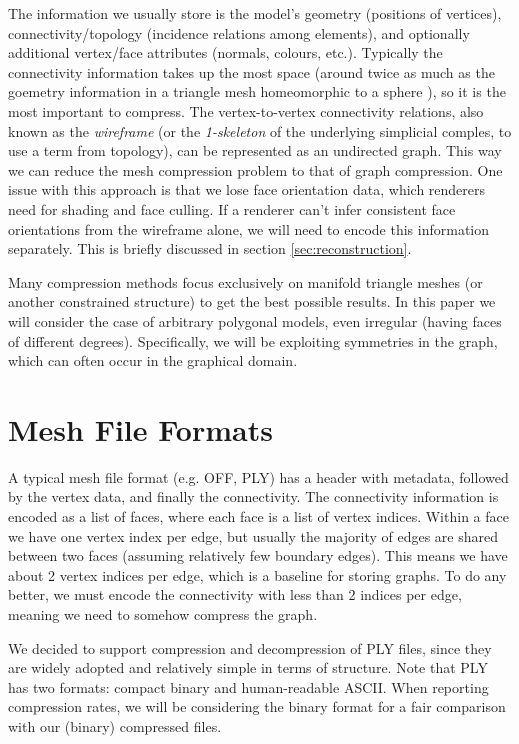 \documentclass{egpubl}
\begin{document}
The information we usually store is the model's geometry (positions of vertices), connectivity/topology (incidence relations among elements), and optionally additional vertex/face attributes (normals, colours, etc.).
Typically the connectivity information takes up the most space (around twice as much as the goemetry information in a triangle mesh homeomorphic to a sphere \cite{rossignac1999edgebreaker}), so it is the most important to compress.
The vertex-to-vertex connectivity relations, also known as the \textit{wireframe} (or the \textit{1-skeleton} of the underlying simplicial comples, to use a term from topology),
can be represented as an undirected graph.
This way we can reduce the mesh compression problem to that of graph compression.
One issue with this approach is that we lose face orientation data, which renderers need for shading and face culling. If a renderer can't infer consistent face orientations from the wireframe alone, we will need to encode this information separately. This is briefly discussed in section \ref{sec:reconstruction}.

Many compression methods focus exclusively on manifold triangle meshes (or another constrained structure) to get the best possible results.  
In this paper we will consider the case of arbitrary polygonal models, even irregular (having faces of different degrees).
Specifically, we will be exploiting symmetries in the graph, which can often occur in the graphical domain.

\section{Mesh File Formats}

A typical mesh file format (e.g. OFF, PLY) has a header with metadata, followed by the vertex data, and finally the connectivity.
The connectivity information is encoded as a list of faces, where each face is a list of vertex indices. Within a face we have one vertex index per edge, but usually the majority of edges are shared between two faces (assuming relatively few boundary edges). This means we have about 2 vertex indices per edge, which is a baseline for storing graphs. To do any better, we must encode the connectivity with less than 2 indices per edge, meaning we need to somehow compress the graph.

We decided to support compression and decompression of PLY files, since they are widely adopted and relatively simple in terms of structure.
Note that PLY has two formats: compact binary and human-readable ASCII. When reporting compression rates, we will be considering the binary format for a fair comparison with our (binary) compressed files.
\end{document}
